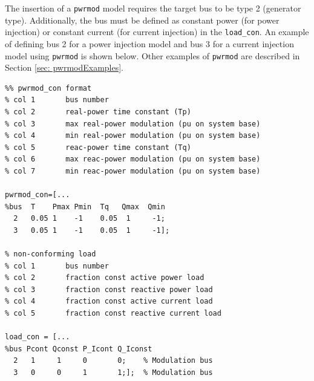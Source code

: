 The insertion of a \verb|pwrmod| model requires the target bus to be type 2 (generator type).
Additionally, the bus must be defined as constant power (for power injection) or constant current (for current injection) in the \verb|load_con|.
An example of defining bus 2 for a power injection model and bus 3 for a current injection model using \verb|pwrmod| is shown below.
Other examples of \verb|pwrmod| are described in Section \ref{sec: pwrmodExamples}.
\begin{verbatim}
%% pwrmod_con format
% col 1       bus number
% col 2       real-power time constant (Tp)
% col 3       max real-power modulation (pu on system base)
% col 4       min real-power modulation (pu on system base)
% col 5       reac-power time constant (Tq)
% col 6       max reac-power modulation (pu on system base)
% col 7       min reac-power modulation (pu on system base)

pwrmod_con=[...
%bus  T    Pmax Pmin  Tq   Qmax  Qmin
  2   0.05 1    -1    0.05  1     -1; 
  3   0.05 1    -1    0.05  1     -1];

% non-conforming load
% col 1       bus number
% col 2       fraction const active power load
% col 3       fraction const reactive power load
% col 4       fraction const active current load
% col 5       fraction const reactive current load

load_con = [...
%bus Pcont Qconst P_Icont Q_Iconst
  2   1     1     0       0;    % Modulation bus
  3   0     0     1       1;];  % Modulation bus
\end{verbatim}
